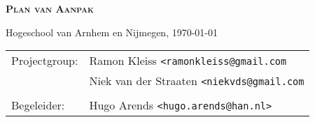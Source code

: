 \begin{titlepage}

\Huge \textsc{\bfseries Plan van Aanpak} \normalsize

\vfill

\begin{minipage}[b][1em][b]{\linewidth}
\end{minipage}

\begin{minipage}[b][1em][b]{\linewidth}
    Hogeschool van Arnhem en Nijmegen, \today
\end{minipage}

\begin{minipage}[b][2em][b]{\linewidth}
\end{minipage}

\begin{minipage}[b][2em][b]{\linewidth}
\end{minipage}

\begin{minipage}[b][4em][b]{\linewidth}
    \begin{tabular}{l l }
        Projectgroup:   & Ramon Kleiss \texttt{<ramonkleiss@gmail.com} \\
                        & Niek van der Straaten \texttt{<niekvds@gmail.com} \\
                        \\
        Begeleider:     & Hugo Arends \texttt{<hugo.arends@han.nl>} \\
    \end{tabular}
\end{minipage}

\end{titlepage}
